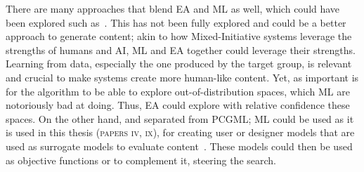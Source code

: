 
There are many approaches that blend EA and ML as well, which could have been explored such as~\cite{schrum_interactive_2020}. This has not been fully explored and could be a better approach to generate content; akin to how Mixed-Initiative systems leverage the strengths of humans and AI, ML and EA together could leverage their strengths. Learning from data, especially the one produced by the target group, is relevant and crucial to make systems create more human-like content. Yet, as important is for the algorithm to be able to explore out-of-distribution spaces, which ML are notoriously bad at doing. Thus, EA could explore with relative confidence these spaces. On the other hand, and separated from PCGML; ML could be used as it is used in this thesis (\textsc{papers iv, ix}), for creating user or designer models that are used as surrogate models to evaluate content~\cite{migkotzidis_susketch_2021,yannakakis_experience-driven_2011}. These models could then be used as objective functions or to complement it, steering the search.





